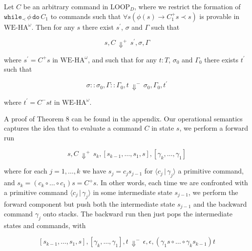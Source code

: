  
Let $C$ be an arbitrary command in $\mathrm{LOOP}_{D}$, where we restrict the formation of $\mathtt{while}_{\prec}\,{\phi}\,\mathtt{do}\,{C_{1}}$ to commands such that $\forall s(\phi(s)\to C_{1}^{+}s\prec s)$ is provable in $\mathrm{WE}\mbox{-}\mathrm{HA}^{\omega}$. Then for any $s$ there exist $s^{\prime}$, $\sigma$ and $\Gamma$ such that\par
  
\par  \quad  \[{s},{C}\,{\Downarrow^{+}}\,{s^{\prime}},{\sigma},{\Gamma}\]\quad  \quad  
  
where $s^{\prime}=C^{+}s$ in $\mathrm{WE}\mbox{-}\mathrm{HA}^{\omega}$, and such that for any $t:T$, $\sigma_{0}$ and $\Gamma_{0}$ there exists $t^{\prime}$ such that\par
  
\par  \quad  \[{\sigma::\sigma_{0}},{\Gamma::\Gamma_{0}},{t}\,{\Downarrow^{-}}\,{\sigma_{0}},{\Gamma_{0}},{t^{\prime}}\]\quad  \quad  
  
where $t^{\prime}=C^{-}st$ in $\mathrm{WE}\mbox{-}\mathrm{HA}^{\omega}$.\par
 
 
 
 
A proof of Theorem 8 can be found in the appendix. Our operational semantics captures the idea that to evaluate a command $C$ in state $s$, we perform a forward run\par
  
\par  \quad  \[{s},{C}\,{\Downarrow^{+}}\,{s_{k}},{[s_{k-1},\ldots,s_{1},s]},{[\gamma_{k},\ldots,\gamma_{1}]}\]\quad  \quad  
  
where for each $j=1,\ldots,k$ we have $s_{j}=c_{j}s_{j-1}$ for $\langle{c_{j}}\,|\,{\gamma_{j}}\rangle$ a primitive command, and $s_{k}=(c_{k}\circ\ldots\circ c_{1})s=C^{+}s$. In other words, each time we are confronted with a primitive command $\langle{c_{j}}\,|\,{\gamma_{j}}\rangle$ in some intermediate state $s_{j-1}$, we perform the forward component but push both the intermediate state $s_{j-1}$ and the backward command $\gamma_{j}$ onto stacks. The backward run then just pops the intermediate states and commands, with\par
  
\par  \quad  \[{[s_{k-1},\ldots,s_{1},s]},{[\gamma_{k},\ldots,\gamma_{1}]},{t}\,{\Downarrow^{-}}\,{\epsilon},{\epsilon},{(\gamma_{1}s\circ\ldots\circ\gamma_{k}s_{k-1})t}\]\quad  \quad  
  

